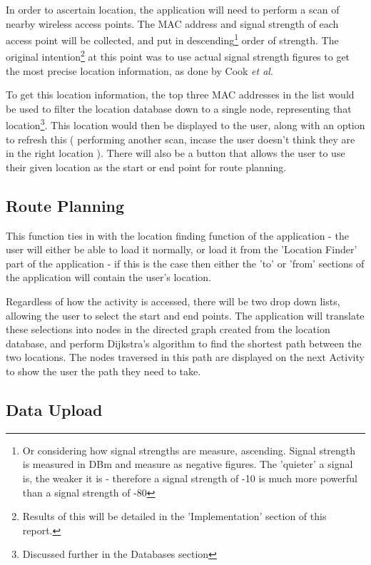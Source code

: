 \documentclass[11pt]{informatics-report}
\begin{document}
In order to ascertain location, the application will need to perform a scan of nearby wireless access points. The MAC address and signal strength of each access point will be collected, and put in descending\footnote{Or considering how signal strengths are measure, ascending. Signal strength is measured in DBm and measure as negative figures. The 'quieter' a signal is, the weaker it is - therefore a signal strength of -10 is much more powerful than a signal strength of -80} order of strength.
The original intention\footnote{Results of this will be detailed in the 'Implementation' section of this report.} at this point was to use actual signal strength figures to get the most precise location information, as done by Cook \textit{et al}\cite{cook2005indoor}. 

To get this location information, the top three MAC addresses in the list would be used to filter the location database down to a single node, representing that location\footnote{Discussed further in the Databases section}. This location would then be displayed to the user, along with an option to refresh this ( performing another scan, incase the user doesn't think they are in the right location ). There will also be a button that allows the user to use their given location as the start or end point for route planning.

\subsection{Route Planning}

This function ties in with the location finding function of the application - the user will either be able to load it normally, or load it from the 'Location Finder' part of the application - if this is the case then either the 'to' or 'from' sections of the application will contain the user's location.

Regardless of how the activity is accessed, there will be two drop down lists, allowing the user to select the start and end points. The application will translate these selections into nodes in the directed graph created from the location database, and perform Dijkstra's algorithm to find the shortest path between the two locations. The nodes traversed in this path are displayed on the next Activity to show the user the path they need to take.

\subsection{Data Upload}
\end{document}
